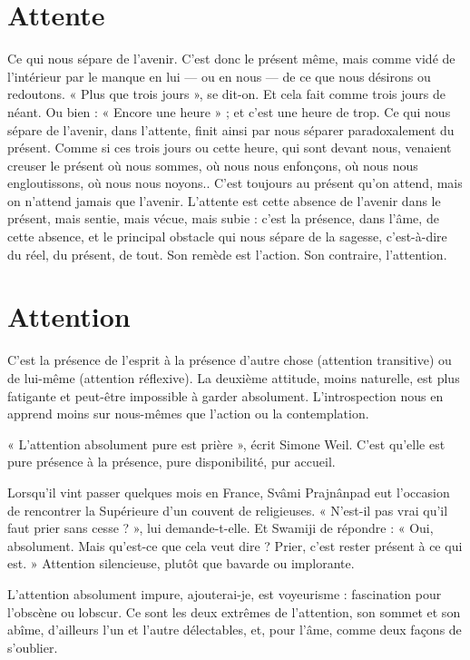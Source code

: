 \section{Attente}
Ce qui nous sépare de l’avenir. C’est donc le présent même, mais
comme vidé de l’intérieur par le manque en lui — ou en nous —
de ce que nous désirons ou redoutons. « Plus que trois jours », se dit-on. Et cela
fait comme trois jours de néant. Ou bien : « Encore une heure » ; et c’est une
heure de trop. Ce qui nous sépare de l’avenir, dans l'attente, finit ainsi par nous
séparer paradoxalement du présent. Comme si ces trois jours ou cette heure,
qui sont devant nous, venaient creuser le présent où nous sommes, où nous
nous enfonçons, où nous nous engloutissons, où nous nous noyons.. C’est
toujours au présent qu’on attend, mais on n'attend jamais que l'avenir.
L’attente est cette absence de l’avenir dans le présent, mais sentie, mais vécue,
mais subie : c’est la présence, dans l’âme, de cette absence, et le principal obstacle
qui nous sépare de la sagesse, c’est-à-dire du réel, du présent, de tout.
Son remède est l’action. Son contraire, l'attention.

\section{Attention}
C'est la présence de l'esprit à la présence d’autre chose (attention
transitive) ou de lui-même (attention réflexive). La
deuxième attitude, moins naturelle, est plus fatigante et peut-être impossible à
garder absolument. L’introspection nous en apprend moins sur nous-mêmes
que l’action ou la contemplation.

« L’attention absolument pure est prière », écrit Simone Weil. C’est qu’elle
est pure présence à la présence, pure disponibilité, pur accueil.

Lorsqu'il vint passer quelques mois en France, Svâmi Prajnânpad eut
l’occasion de rencontrer la Supérieure d’un couvent de religieuses. « N’est-il pas
vrai qu’il faut prier sans cesse ? », lui demande-t-elle. Et Swamiji de répondre :
« Oui, absolument. Mais qu'est-ce que cela veut dire ? Prier, c’est rester présent
à ce qui est. » Attention silencieuse, plutôt que bavarde ou implorante.

L’attention absolument impure, ajouterai-je, est voyeurisme : fascination
pour l’obscène ou lobscur. Ce sont les deux extrêmes de l'attention, son
sommet et son abîme, d’ailleurs l’un et l’autre délectables, et, pour l’âme,
comme deux façons de s’oublier.

